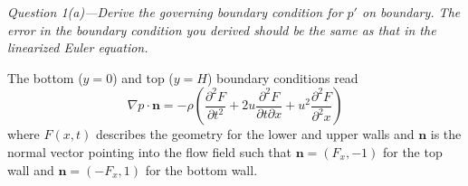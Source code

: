 \documentclass[11pt]{article}
\begin{document}
\begin{tcolorbox}
  \textit{Question 1(a)---Derive the governing boundary condition for $p'$ on boundary. The error in the boundary condition you derived should be the same as that in the linearized Euler equation.}
\end{tcolorbox}

The bottom ($y=0$) and top ($y=H$) boundary conditions read
\begin{equation} \label{eq:yBCfull}
\nabla p \cdot \mathbf{n} = -\rho \left( \frac{\partial^2 F}{\partial t^2} + 2u\frac{\partial^2 F}{\partial t \partial x} + u^2 \frac{\partial^2 F}{\partial^2 x} \right)
\end{equation}
where $F(x,t)$ describes the geometry for the lower and upper walls and $\mathbf{n}$ is the normal vector pointing into the flow field such that $\mathbf{n} = (F_x, -1)$ for the top wall and $\mathbf{n} = (-F_x, 1)$ for the bottom wall.
\end{document}
